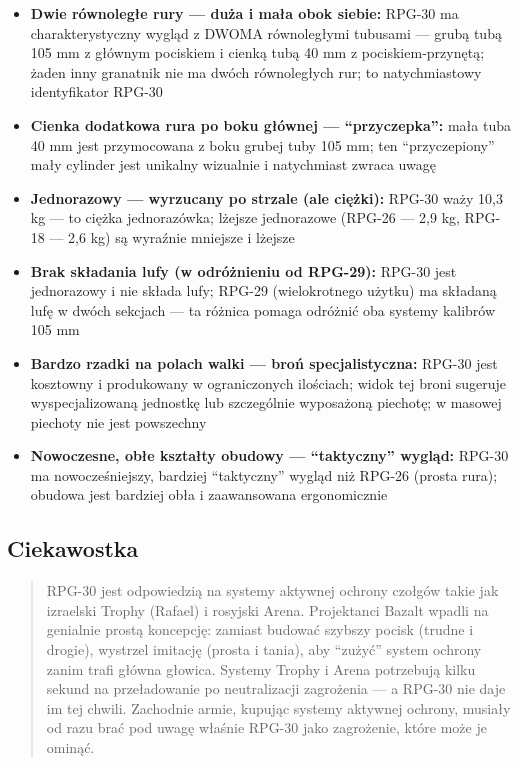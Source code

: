 \documentclass[12pt,oneside]{book}
\providecommand{\tightlist}{%
  \setlength{\itemsep}{0pt}\setlength{\parskip}{0pt}}
\begin{document}
\begin{itemize}
\tightlist
\item
  \textbf{Dwie równoległe rury --- duża i mała obok siebie:} RPG-30 ma
  charakterystyczny wygląd z DWOMA równoległymi tubusami --- grubą tubą
  105 mm z głównym pociskiem i cienką tubą 40 mm z pociskiem-przynętą;
  żaden inny granatnik nie ma dwóch równoległych rur; to natychmiastowy
  identyfikator RPG-30
\item
  \textbf{Cienka dodatkowa rura po boku głównej --- ``przyczepka'':}
  mała tuba 40 mm jest przymocowana z boku grubej tuby 105 mm; ten
  ``przyczepiony'' mały cylinder jest unikalny wizualnie i natychmiast
  zwraca uwagę
\item
  \textbf{Jednorazowy --- wyrzucany po strzale (ale ciężki):} RPG-30
  waży 10,3 kg --- to ciężka jednorazówka; lżejsze jednorazowe (RPG-26
  --- 2,9 kg, RPG-18 --- 2,6 kg) są wyraźnie mniejsze i lżejsze
\item
  \textbf{Brak składania lufy (w odróżnieniu od RPG-29):} RPG-30 jest
  jednorazowy i nie składa lufy; RPG-29 (wielokrotnego użytku) ma
  składaną lufę w dwóch sekcjach --- ta różnica pomaga odróżnić oba
  systemy kalibrów 105 mm
\item
  \textbf{Bardzo rzadki na polach walki --- broń specjalistyczna:}
  RPG-30 jest kosztowny i produkowany w ograniczonych ilościach; widok
  tej broni sugeruje wyspecjalizowaną jednostkę lub szczególnie
  wyposażoną piechotę; w masowej piechoty nie jest powszechny
\item
  \textbf{Nowoczesne, obłe kształty obudowy --- ``taktyczny'' wygląd:}
  RPG-30 ma nowocześniejszy, bardziej ``taktyczny'' wygląd niż RPG-26
  (prosta rura); obudowa jest bardziej obła i zaawansowana ergonomicznie
\end{itemize}

\subsection{Ciekawostka}\label{ciekawostka-89}

\begin{quote}
RPG-30 jest odpowiedzią na systemy aktywnej ochrony czołgów takie jak
izraelski Trophy (Rafael) i rosyjski Arena. Projektanci Bazalt wpadli na
genialnie prostą koncepcję: zamiast budować szybszy pocisk (trudne i
drogie), wystrzel imitację (prosta i tania), aby ``zużyć'' system
ochrony zanim trafi główna głowica. Systemy Trophy i Arena potrzebują
kilku sekund na przeładowanie po neutralizacji zagrożenia --- a RPG-30
nie daje im tej chwili. Zachodnie armie, kupując systemy aktywnej
ochrony, musiały od razu brać pod uwagę właśnie RPG-30 jako zagrożenie,
które może je ominąć.
\end{quote}
\end{document}
